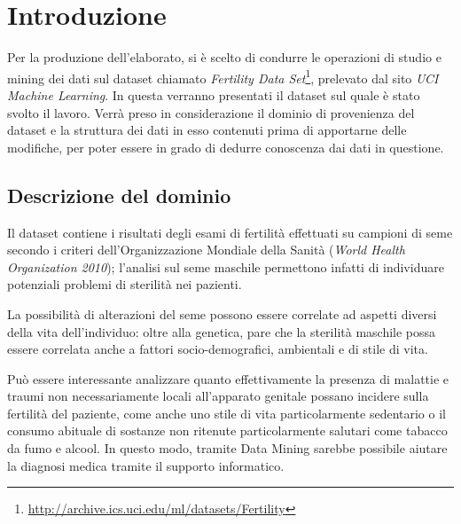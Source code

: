 \section{Introduzione}\label{sec:intro}

Per la produzione dell'elaborato, si è scelto di condurre le operazioni di studio e mining dei dati sul dataset chiamato \emph{Fertility Data Set}\footnote{\url{http://archive.ics.uci.edu/ml/datasets/Fertility}}, prelevato dal sito \emph{UCI Machine Learning}.
In questa  verranno presentati il dataset sul quale è stato svolto il lavoro.
Verrà preso in considerazione il dominio di provenienza del dataset e la struttura dei dati in esso contenuti prima di apportarne delle modifiche,
per poter essere in grado di dedurre conoscenza dai dati in questione.

\subsection{Descrizione del dominio}\label{subsec:intro:domain}

Il dataset contiene i risultati degli esami di fertilità effettuati su campioni di seme secondo i criteri dell'Organizzazione Mondiale della Sanità (\emph{World Health Organization 2010});
l'analisi sul seme maschile permettono infatti di individuare potenziali problemi di sterilità nei pazienti.

La possibilità di alterazioni del seme possono essere correlate ad aspetti diversi della vita dell'individuo:
oltre alla genetica, pare che la sterilità maschile possa essere correlata anche a fattori socio-demografici, ambientali e di stile di vita.

Può essere interessante analizzare quanto effettivamente la presenza di malattie e traumi non necessariamente locali all'apparato genitale possano incidere sulla fertilità del paziente,
come anche uno stile di vita particolarmente sedentario o il consumo abituale di sostanze non ritenute particolarmente salutari come tabacco da fumo e alcool.
In questo modo, tramite Data Mining sarebbe possibile aiutare la diagnosi medica tramite il supporto informatico.

